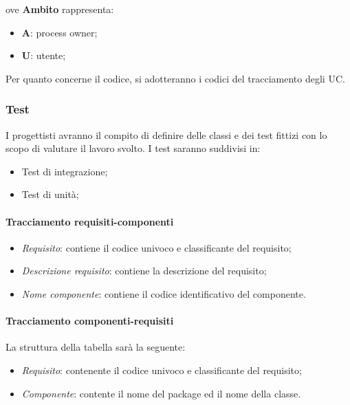 ove \textbf{Ambito} rappresenta:
\begin{itemize}
\item \textbf{A}: process owner;
\item \textbf{U}: utente;
\end{itemize}

Per quanto concerne il codice, si adotteranno i codici del tracciamento degli UC.

\subsubsection{Test} I progettisti avranno il compito di definire delle classi e dei test fittizi con lo scopo di valutare il lavoro svolto.
I test saranno suddivisi in:
\begin{itemize}
\item Test di integrazione;
\item Test di unità;
\end{itemize}

\paragraph{Tracciamento requisiti-componenti}

\begin{itemize}
\item \textit{Requisito}: contiene il codice univoco e classificante del requisito;
\item \textit{Descrizione requisito}: contiene la descrizione del requisito;
\item \textit{Nome componente}: contiene il codice identificativo del componente.
\end{itemize}

\paragraph{Tracciamento componenti-requisiti}
La struttura della tabella sarà la seguente:
\begin{itemize}
\item \textit{Requisito}: contenente il codice univoco e classificante del requisito;
\item \textit{Componente}: contente il nome del package ed il nome della classe.
\end{itemize}

